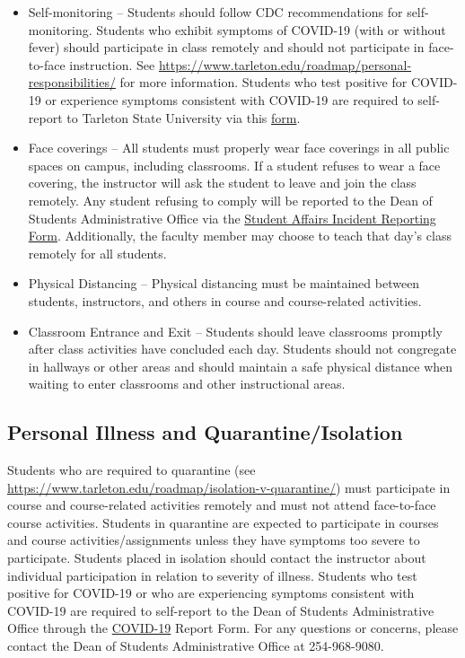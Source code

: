\documentclass[10pt]{article}
\begin{document}
\begin{itemize}
\item Self-monitoring – Students should follow CDC recommendations for self-monitoring. Students who exhibit symptoms of COVID-19 (with or without fever) should participate in class remotely and should not participate in face-to-face instruction. See \url{https://www.tarleton.edu/roadmap/personal-responsibilities/} for more information. Students who test positive for COVID-19 or experience symptoms consistent with COVID-19 are required to self-report to Tarleton State University via this \href{https://cm.maxient.com/reportingform.php?TarletonStateUniv\&layout\_id=6.}{form}.

\item Face coverings – All students must properly wear face coverings in all public spaces on campus, including classrooms.  If a student refuses to wear a face covering, the instructor will ask the student to leave and join the class remotely. Any student refusing to comply will be reported  to the Dean of Students Administrative Office via the \href{https://cm.maxient.com/reportingform.php?TarletonStateUniv\&layout\_id=0}{Student Affairs Incident Reporting Form}. Additionally, the faculty member may choose to teach that day’s class remotely for all students.

\item Physical Distancing – Physical distancing must be maintained between students, instructors, and others in course and course-related activities.

\item Classroom Entrance and Exit – Students should leave classrooms promptly after class activities have concluded each day. Students should not congregate in hallways or other areas and should maintain a safe physical distance when waiting to enter classrooms and other instructional areas.
\end{itemize}


\subsection*{Personal Illness and Quarantine/Isolation}
\label{sec:orgab57868}
Students who are required to quarantine (see \url{https://www.tarleton.edu/roadmap/isolation-v-quarantine/}) must participate in course and course-related activities remotely and must not attend face-to-face course activities. Students in quarantine are expected to participate in courses and course activities/assignments unless they have symptoms too severe to participate. Students placed in isolation should contact the instructor about individual participation in relation to severity of illness. Students who test positive for COVID-19 or who are experiencing symptoms consistent with COVID-19 are required to self-report to the Dean of Students Administrative Office through the \href{https://cm.maxient.com/reportingform.php?TarletonStateUniv\&layout\_id=6}{COVID-19} Report Form.  For any questions or concerns, please contact the Dean of Students Administrative Office at 254-968-9080. 
\end{document}
